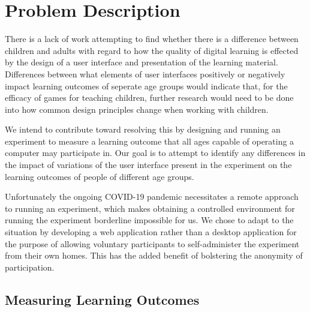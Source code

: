 \documentclass[12pt]{report}
\begin{document}
\clearpage


\setcounter{page}{1}

% 
%

% 

\chapter{Problem Description}

There is a lack of work attempting to find whether there is a difference between children and adults with regard to how the quality of digital learning is effected by the design of a user interface and presentation of the learning material. Differences between what elements of user interfaces positively or negatively impact learning outcomes of seperate age groups would indicate that, for the efficacy of games for teaching children, further research would need to be done into how common design principles change when working with children.

We intend to contribute toward resolving this by designing and running an experiment to measure a learning outcome that all ages capable of operating a computer may participate in. Our goal is to attempt to identify any differences in the impact of variations of the user interface present in the experiment on the learning outcomes of people of different age groups.

Unfortunately the ongoing COVID-19 pandemic necessitates a remote approach to running an experiment, which makes obtaining a controlled environment for running the experiment borderline impossible for us. We chose to adapt to the situation by developing a web application rather than a desktop application for the purpose of allowing voluntary participants to self-administer the experiment from their own homes. This has the added benefit of bolstering the anonymity of participation.

\section{Measuring Learning Outcomes}
\end{document}
